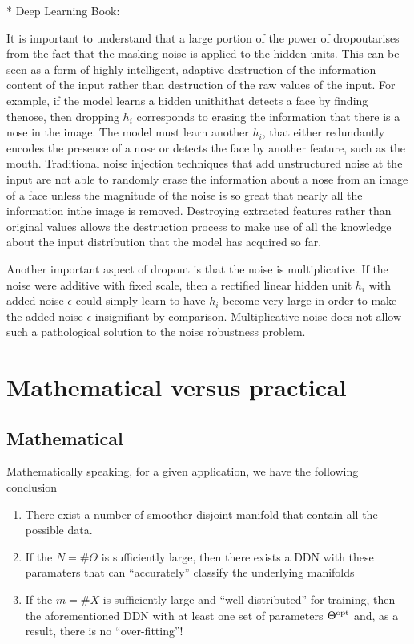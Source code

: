 * Deep Learning Book:

It is important to understand that a large portion of the power of dropoutarises from the fact that the masking noise is applied to the hidden units. This can be seen as a form of highly intelligent, adaptive destruction of the information content of the input rather than destruction of the raw values of the input. For example, if the model learns a hidden unithithat detects a face by finding thenose, then dropping $h_i$ corresponds to erasing the information that there is a nose in the image. The model must learn another $h_i$, that either redundantly encodes the presence of a nose or detects the face by another feature, such as the mouth. Traditional noise injection techniques that add unstructured noise at the input are not able to randomly erase the information about a nose from an image of a face unless the magnitude of the noise is so great that nearly all the information inthe image is removed. Destroying extracted features rather than original values allows the destruction process to make use of all the knowledge about the input distribution that the model has acquired so far.

Another important aspect of dropout is that the noise is multiplicative. If the noise were additive with fixed scale, then a rectified linear hidden unit $h_i$ with added noise $\epsilon$ could simply learn to have $h_i$ become very large in order to make the added noise $\epsilon$ insignifiant by comparison. Multiplicative noise does not allow such a pathological solution to the noise robustness problem.

\newpage
\section{Mathematical versus practical}


\subsection{Mathematical}
Mathematically speaking, for a given application, we have the following conclusion
\begin{enumerate}
\item There exist a number of smoother disjoint manifold that  contain all the possible data.
\item If the $N=\#\Theta$ is sufficiently large, then there exists a DDN with these paramaters that can ``accurately'' classify the underlying manifolds
\item If the $m=\# X$ is sufficiently large and ``well-distributed'' for training, then the aforementioned DDN with at least one set of parameters $\Theta^{\rm opt}$ and, as a result, there is no ``over-fitting''!
\end{enumerate}

